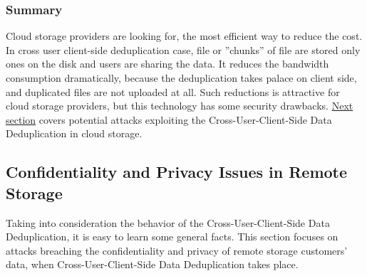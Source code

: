 \documentclass[12pt]{article}
\begin{document}
\subsubsection{Summary}
\label{subsub:SummaryDedup}
Cloud storage providers are looking for, the most efficient way to reduce the cost. In cross user client-side deduplication  case, file or ”chunks” of file are stored only ones on the disk and users are sharing the data. It reduces the bandwidth consumption dramatically, because the deduplication takes palace on client side, and duplicated files are not uploaded at all.\cite{DeDupDropBox} Such reductions is attractive for cloud storage providers, but this technology has some security drawbacks. \hyperref[sub:ConfidentialityAndPrivacy]{Next section} covers potential attacks exploiting the Cross-User-Client-Side Data Deduplication in cloud storage.


\subsection{Confidentiality and Privacy Issues in Remote Storage}
\label{sub:ConfidentialityAndPrivacy}
Taking into consideration the behavior of the Cross-User-Client-Side Data Deduplication, it is easy to learn some general facts. This section focuses on attacks breaching the  confidentiality  and privacy of remote storage customers' data, when Cross-User-Client-Side Data Deduplication takes place.
\end{document}

